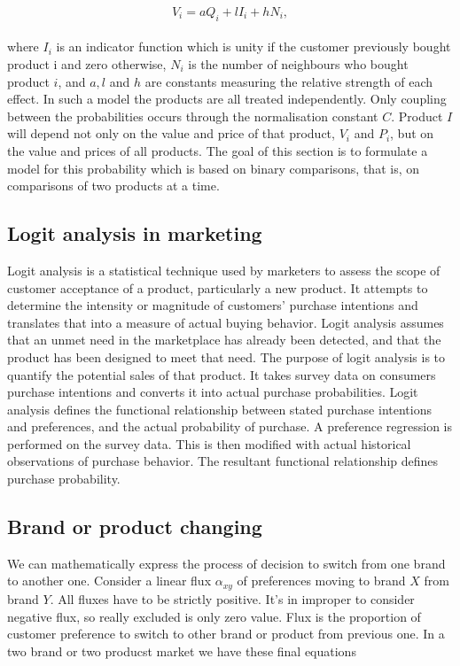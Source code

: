 \begin{equation} \label{eq:9}
V_i = aQ_i + lI_i + hN_i,
\end{equation}
\\
where $I_i$ is an indicator function which is unity if the customer previously bought product i and zero otherwise,
$N_i$ is the number of neighbours who bought product $i$, and $a, l$ and $h$ are constants measuring the relative strength
of each effect.
In such a model the products are all treated independently.
Only coupling between the probabilities occurs through the normalisation constant $C$.
Product $I$ will depend not only on the value and price of that product, $V_i$ and $P_i$, but on the value and prices of all products.
The goal of this section is to formulate a model for this probability which is based on binary comparisons, that is,
on comparisons of two products at a time.\\
\subsection{Logit analysis in marketing} \label{subsec:logit}
Logit analysis is a statistical technique used by marketers to assess the scope of customer acceptance of a product, particularly a new product.
It attempts to determine the intensity or magnitude of customers' purchase intentions and translates that into a measure of actual buying behavior.
Logit analysis assumes that an unmet need in the marketplace has already been detected, and that the product has been designed to meet that need.
The purpose of logit analysis is to quantify the potential sales of that product.
It takes survey data on consumers purchase intentions and converts it into actual purchase probabilities.
Logit analysis defines the functional relationship between stated purchase intentions and preferences, and the actual probability of purchase.
A preference regression is performed on the survey data.
This is then modified with actual historical observations of purchase behavior.
The resultant functional relationship defines purchase probability.

\subsection{Brand or product changing} \label{subsec:brand}
We can mathematically express the process of decision to switch from one brand to another one.
Consider a linear flux $\alpha_{xy}$ of preferences moving to brand $X$ from brand $Y$.
All fluxes have to be strictly positive.
It's in improper to consider negative flux, so really excluded is only zero value.
Flux is the proportion of customer preference to switch to other brand or product from previous one.
In a two brand or two producst market we have these final equations~\cite{patel}

